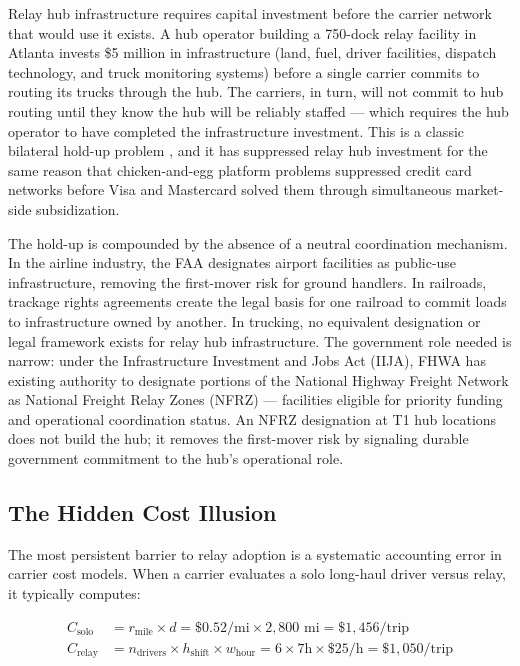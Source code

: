 Relay hub infrastructure requires capital investment before the carrier network that would use it exists. A hub operator building a 750-dock relay facility in Atlanta invests \$5 million in infrastructure (land, fuel, driver facilities, dispatch technology, and truck monitoring systems) before a single carrier commits to routing its trucks through the hub. The carriers, in turn, will not commit to hub routing until they know the hub will be reliably staffed --- which requires the hub operator to have completed the infrastructure investment. This is a classic bilateral hold-up problem \citep{Williamson1979}, and it has suppressed relay hub investment for the same reason that chicken-and-egg platform problems suppressed credit card networks before Visa and Mastercard solved them through simultaneous market-side subsidization.

The hold-up is compounded by the absence of a neutral coordination mechanism. In the airline industry, the FAA designates airport facilities as public-use infrastructure, removing the first-mover risk for ground handlers. In railroads, trackage rights agreements create the legal basis for one railroad to commit loads to infrastructure owned by another. In trucking, no equivalent designation or legal framework exists for relay hub infrastructure. The government role needed is narrow: under the Infrastructure Investment and Jobs Act (IIJA), FHWA has existing authority to designate portions of the National Highway Freight Network as National Freight Relay Zones (NFRZ) --- facilities eligible for priority funding and operational coordination status. An NFRZ designation at T1 hub locations does not build the hub; it removes the first-mover risk by signaling durable government commitment to the hub's operational role.

\subsection{The Hidden Cost Illusion}

The most persistent barrier to relay adoption is a systematic accounting error in carrier cost models. When a carrier evaluates a solo long-haul driver versus relay, it typically computes:

\begin{align*}
C_{\text{solo}} &= r_{\text{mile}} \times d = \$0.52/\text{mi} \times 2{,}800\text{ mi} = \$1{,}456/\text{trip} \\
C_{\text{relay}} &= n_{\text{drivers}} \times h_{\text{shift}} \times w_{\text{hour}} = 6 \times 7\text{h} \times \$25/\text{h} = \$1{,}050/\text{trip}
\end{align*}

